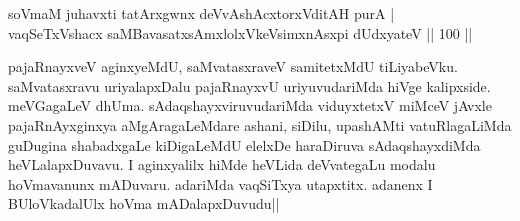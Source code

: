 \begin{shl}
soVmaM juhavxti tatArxgwnx deVvAshAcxtorxVditAH purA | \\
vaqSeTxVshacx saMBavasatxsAmxlolxVkeV\s simxnAsx\s pi dUdxyateV \hfill|| 100 || 
\end{shl}

\begin{artha}
pajaRnayxveV aginxyeMdU, saMvatasxraveV samitetxMdU tiLiyabeVku. 
saMvatasxravu uriyalapxDalu pajaRnayxvU uriyuvudariMda hiVge 
kalipxside. meVGagaLeV dhUma. sAdaqshayxviruvudariMda viduyxtetxV 
miMceV jAvxle pajaRnAyxginxya aMgAragaLeMdare ashani, siDilu, 
upashAMti vatuRlagaLiMda guDugina shabadxgaLe kiDigaLeMdU elelxDe 
haraDiruva sAdaqshayxdiMda heVLalapxDuvavu. I aginxyalilx hiMde 
heVLida deVvategaLu modalu hoVmavanunx mADuvaru. adariMda vaqSiTxya 
utapxtitx. adanenx I BUloVkadalUlx hoVma mADalapxDuvudu||
\end{artha}
